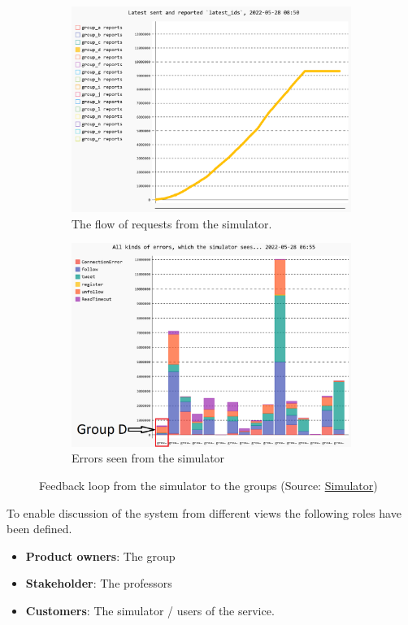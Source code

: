\begin{figure}[h!]
  \centering
  \begin{subfigure}[b]{0.45\linewidth}
    \includegraphics[width=\linewidth]{images/introduction/latest_group_d.png}
    \caption{The flow of requests from the simulator.}
  \end{subfigure}
  \begin{subfigure}[b]{0.45\linewidth}
    \includegraphics[width=\linewidth]{images/introduction/errors_group_d.png}
    \caption{Errors seen from the simulator}
  \end{subfigure}
  \caption{Feedback loop from the simulator to the groups (Source: \href{http://164.92.246.227/status.html}{Simulator})}
  \label{fig:Simulator}
\end{figure}

To enable discussion of the system from different views the following roles have been defined.

\begin{itemize}
    \item \textbf{Product owners}: The group
    \item \textbf{Stakeholder}: The professors
    \item \textbf{Customers}: The simulator / users of the service.
\end{itemize}

  